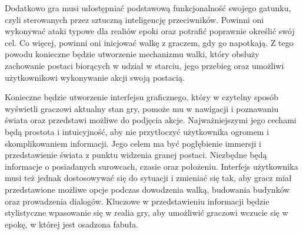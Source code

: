Dodatkowo gra musi udostępniać podstawową funkcjonalność swojego gatunku, czyli sterowanych przez sztuczną inteligencję
przeciwników. Powinni oni wykonywać ataki typowe dla realiów epoki oraz potrafić poprawnie określić swój cel. Co więcej,
powinni oni inicjować walkę z graczem, gdy go napotkają. Z tego powodu konieczne będzie utworzenie mechanizmu walki, który
obsłuży zachowanie postaci biorących w udział w starciu, jego przebieg oraz umożliwi użytkownikowi wykonywanie akcji
swoją postacią.

Konieczne będzie utworzenie interfejsu graficznego, który w czytelny sposób wyświetli graczowi aktualny stan gry, pomoże
mu w nawigacji i poznawaniu świata oraz przedstawi możliwe do podjęcia akcje. Najważniejszymi jego cechami będą prostota
i intuicyjność, aby nie przytłoczyć użytkownika ogromem i skomplikowaniem informacji. Jego celem ma być pogłębienie immersji
i przedstawienie świata z punktu widzenia granej postaci. Niezbędne będą informacje o posiadanych surowcach, czasie oraz
położeniu. Interfejs użytkownika musi też jednak dostosowywać się do sytuacji i zmieniać się tak, aby gracz miał przedstawione
możliwe opcje podczas dowodzenia walką, budowania budynków oraz prowadzenia dialogów. Kluczowe w przedstawieniu informacji
będzie stylistyczne wpasowanie się w realia gry, aby umożliwić graczowi wczucie się w epokę, w której jest osadzona fabuła.
